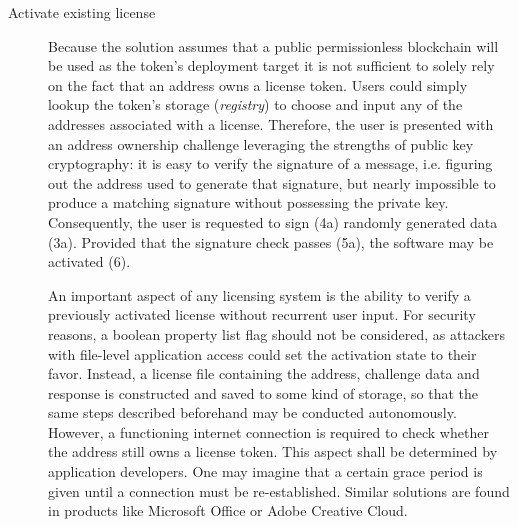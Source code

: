 \documentclass{egpubl}
\begin{document}
\begin{description}
	\item[Activate existing license \label{itm:activateFlow}]
	Because the solution assumes that a public permissionless blockchain will be used as the token's deployment target it is not sufficient to solely rely on the fact that an address owns a license token. Users could simply lookup the token's storage (\textit{registry}) to choose and input any of the addresses associated with a license. Therefore, the user is presented with an address ownership challenge leveraging the strengths of public key cryptography: it is easy to verify the signature of a message, i.e. figuring out the address used to generate that signature, but nearly impossible to produce a matching signature without possessing the private key. Consequently, the user is requested to sign (4a) randomly generated data (3a). Provided that the signature check passes (5a), the software may be activated (6).
	
	An important aspect of any licensing system is the ability to verify a previously activated license without recurrent user input. For security reasons, a boolean property list flag should not be considered, as attackers with file-level application access could set the activation state to their favor. Instead, a license file containing the address, challenge data and response is constructed and saved to some kind of storage, so that the same steps described beforehand may be conducted autonomously. However, a functioning internet connection is required to check whether the address still owns a license token. This aspect shall be determined by application developers. One may imagine that a certain grace period is given until a connection must be re-established. Similar solutions are found in products like Microsoft Office or Adobe Creative Cloud. 
	

\end{description}
\end{document}
